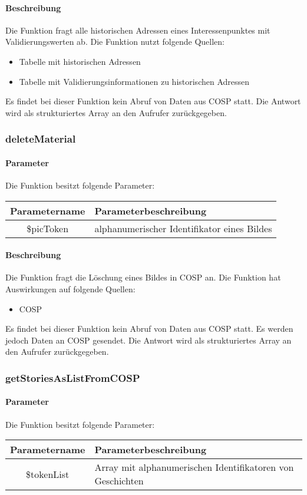 \paragraph{Beschreibung} Die Funktion fragt alle historischen Adressen eines Interessenpunktes mit Validierungswerten ab. Die Funktion nutzt folgende Quellen:
\begin{itemize}
	\item Tabelle mit historischen Adressen
	\item Tabelle mit Validierungsinformationen zu historischen Adressen
\end{itemize}
Es findet bei dieser Funktion kein Abruf von Daten aus {\glqq COSP\grqq} statt. Die Antwort wird als strukturiertes Array an den Aufrufer zurückgegeben.
\subsubsection{deleteMaterial}
\paragraph{Parameter} Die Funktion besitzt folgende Parameter:
\begin{table}[H]
	\begin{tabular}{|c|p{11cm}|}
		\hline
		\textbf{Parametername} & \textbf{Parameterbeschreibung} \\ \hline
		\$picToken      & alphanumerischer Identifikator eines Bildes \\ \hline
	\end{tabular}
\end{table}
\paragraph{Beschreibung} Die Funktion fragt die Löschung eines Bildes in {\glqq COSP\grqq} an. Die Funktion hat Auswirkungen auf folgende Quellen:
\begin{itemize}
	\item COSP
\end{itemize}
Es findet bei dieser Funktion kein Abruf von Daten aus {\glqq COSP\grqq} statt. Es werden jedoch Daten an {\glqq COSP\grqq} gesendet. Die Antwort wird als strukturiertes Array an den Aufrufer zurückgegeben.
\subsubsection{getStoriesAsListFromCOSP}
\paragraph{Parameter} Die Funktion besitzt folgende Parameter:
\begin{table}[H]
	\begin{tabular}{|c|p{11cm}|}
		\hline
		\textbf{Parametername} & \textbf{Parameterbeschreibung} \\ \hline
		\$tokenList      & Array mit alphanumerischen Identifikatoren von Geschichten \\ \hline
	\end{tabular}
\end{table}
